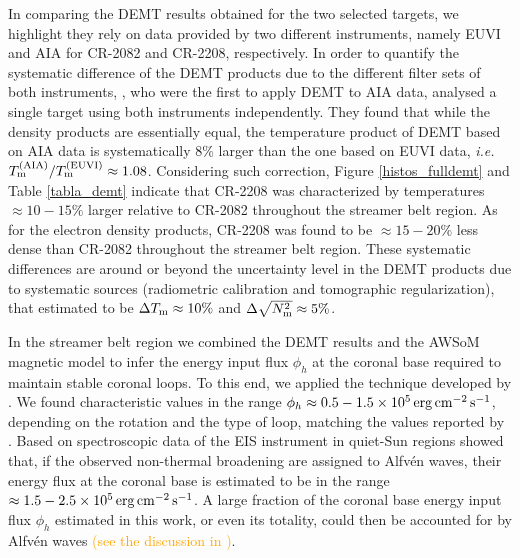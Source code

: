 \documentclass[namedreferences]{solarphysics}
\newcommand{\cm}{{\rm cm}}
\newcommand{\cminvs}{\cm^{-2}}
\newcommand{\erg}{{\rm erg}}
\newcommand{\s}{{\rm s}}
\newcommand{\Tm}{T_{\rm m}}
\newcommand{\Nsqm}{N^2_{{\rm m}}}
\newcommand{\sqravgN}{\sqrt{\Nsqm}}
\def\albert#1{\textcolor{orange}{#1}}
\begin{document}
\begin{article}
In comparing the DEMT results obtained for the two selected targets, {we highlight} they rely on data provided by two different instruments, {namely EUVI and AIA for CR-2082 and CR-2208, respectively.} In order to quantify the systematic difference of the DEMT products {due to the different filter sets of} both instruments, \citet{nuevo_2015}, who were the first to apply DEMT to AIA data, {analysed} a single target using both instruments independently. They found that while the density {products are} essentially equal, the temperature product of DEMT based on AIA data is systematically 8\% larger than the one based on EUVI data, \textit{i.e.} $\Tm^{\rm(AIA)}/\Tm^{\rm(EUVI)} \approx 1.08$. Considering such correction, Figure \ref{histos_fulldemt} and Table \ref{tabla_demt} indicate that CR-2208 was {characterized by temperatures $\approx 10-15\%$ larger relative to CR-2082} throughout the streamer belt region. As for the electron density products, CR-2208 was found to be $\approx 15-20\%$ less dense than CR-2082 throughout the streamer belt region. These systematic differences are {around or beyond the uncertainty level in the DEMT products due to systematic sources (radiometric calibration and tomographic regularization), that \citet{lloveras_2017} {estimated to be $\Delta\Tm\approx 10\%$ and $\Delta\sqravgN\approx 5\%$}.}

{In the streamer belt region we combined the DEMT results and the AWSoM magnetic model to infer the energy input flux $\phi_h$ at the coronal base required to maintain stable coronal loops. To this end, we applied the technique developed by \citet{maccormack_2017}. We found characteristic values in the range $\phi_h\approx 0.5-1.5 \times 10^5\,\erg\,\cminvs\,\s^{-1}$, depending on the rotation and the type of {loop, matching the values reported by} \citet{maccormack_2017}. Based on spectroscopic data of the EIS instrument in quiet-Sun regions \citet{hahn_2014} showed that, if the observed non-thermal broadening are assigned to Alfvén waves, their energy flux at the coronal base is estimated to be in the range $\approx 1.5-2.5\times 10^5\,\erg\,\cminvs\,\s^{-1}$. A large fraction of the coronal base energy input flux $\phi_h$ estimated in this work, or even its totality, could then be accounted for by Alfvén waves \albert{(see the discussion in \citealt{maccormack_2017})}.}


\end{article}
\end{document}
